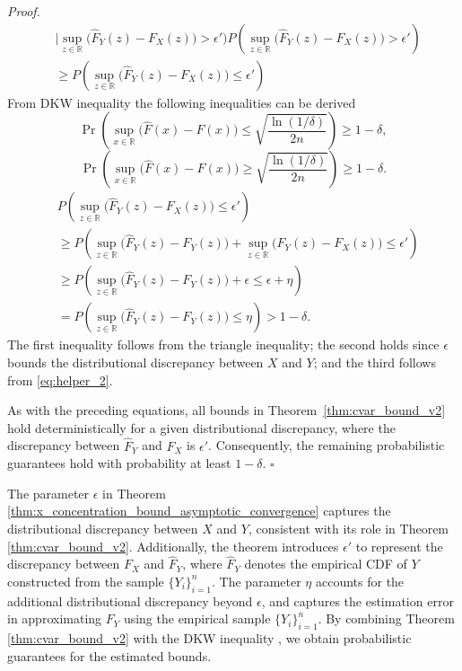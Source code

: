 \documentclass[letterpaper]{article} %
\newenvironment{proof}{\noindent\textit{Proof.}}{\hfill$\square$}
\begin{document}
\begin{proof}
\begin{equation}
\begin{aligned}
			&\Big|\sup_{z \in \mathbb{R}} \big( \hat{F}_Y(z) - F_X(z) \big) > \epsilon'\Big) 
			P(\sup_{z \in \mathbb{R}} \big( \hat{F}_Y(z) - F_X(z) \big) > \epsilon') \\
			&\geq P(\sup_{z \in \mathbb{R}} \big( \hat{F}_Y(z) - F_X(z) \big) \leq \epsilon')
		\end{aligned}
	\end{equation}
	From DKW \cite{DKW_inequality} inequality the following inequalities can be derived \cite{pmlr-v97-thomas19a}
	\begin{equation}\label{eq:helper_2}
		\Pr \left( \sup_{x \in \mathbb{R}} \big( \hat{F}(x) - F(x) \big) 
		\leq \sqrt{\frac{\ln(1/\delta)}{2n}} \right) \geq 1 - \delta,
	\end{equation}
	\begin{equation}
		\Pr \left( \sup_{x \in \mathbb{R}} \big( \hat{F}(x) - F(x) \big) 
		\geq \sqrt{\frac{\ln(1/\delta)}{2n}} \right) \geq 1 - \delta.
	\end{equation}
	\begin{equation}
		\begin{aligned}
			&P(\sup_{z \in \mathbb{R}} \big( \hat{F}_Y(z) - F_X(z) \big) \leq \epsilon') \\
			&\geq P(\sup_{z \in \mathbb{R}} \big( \hat{F}_Y(z) - F_Y(z) \big) + \sup_{z \in \mathbb{R}} \big( F_Y(z) - F_X(z) \big)\leq \epsilon') \\
			&\geq P(\sup_{z \in \mathbb{R}} \big( \hat{F}_Y(z) - F_Y(z) \big) + \epsilon \leq \epsilon + \eta) \\
			&=P(\sup_{z \in \mathbb{R}} \big( \hat{F}_Y(z) - F_Y(z) \big)\leq \eta) > 1-\delta.
		\end{aligned}
	\end{equation}
	The first inequality follows from the triangle inequality; the second holds since $\epsilon$ bounds the distributional discrepancy between $X$ and $Y$; and the third follows from \eqref{eq:helper_2}.
	
	As with the preceding equations, all bounds in Theorem~\ref{thm:cvar_bound_v2} hold deterministically for a given distributional discrepancy, where the discrepancy between $\hat{F}_Y$ and $F_X$ is $\epsilon'$. Consequently, the remaining probabilistic guarantees hold with probability at least $1 - \delta$.
\end{proof}

The parameter $\epsilon$ in Theorem \ref{thm:x_concentration_bound_asymptotic_convergence} captures the distributional discrepancy between $X$ and $Y$, consistent with its role in Theorem \ref{thm:cvar_bound_v2}. Additionally, the theorem introduces $\epsilon'$ to represent the discrepancy between $F_X$ and $\hat{F}_Y$, where $\hat{F}_Y$ denotes the empirical CDF of $Y$ constructed from the sample $\{Y_i\}_{i=1}^n$. The parameter $\eta$ accounts for the additional distributional discrepancy beyond $\epsilon$, and captures the estimation error in approximating $F_Y$ using the empirical sample $\{Y_i\}_{i=1}^n$. By combining Theorem \ref{thm:cvar_bound_v2} with the DKW inequality \cite{DKW_inequality}, we obtain probabilistic guarantees for the estimated bounds.
\end{document}
